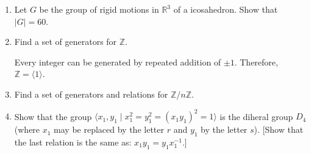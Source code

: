 \begin{enumerate}[resume]
\item
  Let \(G\) be the group of rigid motions in \(\mathbb{R}^3\) of a icosahedron.
  Show that \(\lvert G\rvert = 60\).
\item
  Find a set of generators for \(\mathbb{Z}\).
  \par\smallskip
  Every integer can be generated by repeated addition of \(\pm 1\).
  Therefore, \(\mathbb{Z} = \langle 1\rangle\).
\item
  Find a set of generators and relations for \(\mathbb{Z}/n\mathbb{Z}\).
  \par\smallskip
\item
  Show that the group
  \(\langle x_1,y_1\mid x_1^2 = y_1^2 = (x_1y_1)^2 = 1\rangle\) is the diheral
  group \(D_4\) (where \(x_1\) may be replaced by the letter \(r\) and \(y_1\)
  by the letter \(s\)).
  [Show that the last relation is the same as: \(x_1y_1 = y_1x_1^{-1}\).]
\end{enumerate}
